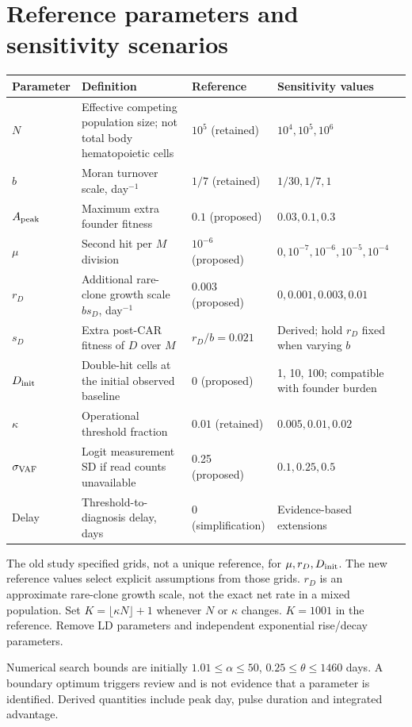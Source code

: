 \documentclass[11pt]{article}
\begin{document}
\section{Reference parameters and sensitivity scenarios}
\begin{longtable}{@{}p{}p{}p{}p{}@{}}
\toprule
Parameter & Definition & Reference & Sensitivity values\\\midrule\endhead
$N$ & Effective competing population size; not total body hematopoietic cells & $10^5$ (retained) & $10^4,10^5,10^6$\\
$b$ & Moran turnover scale, day$^{-1}$ & $1/7$ (retained) & $1/30,1/7,1$\\
$A_{\rm peak}$ & Maximum extra founder fitness & $0.1$ (proposed) & $0.03,0.1,0.3$\\
$\mu$ & Second hit per $M$ division & $10^{-6}$ (proposed) & $0,10^{-7},10^{-6},10^{-5},10^{-4}$\\
$r_D$ & Additional rare-clone growth scale $bs_D$, day$^{-1}$ & $0.003$ (proposed) & $0,0.001,0.003,0.01$\\
$s_D$ & Extra post-CAR fitness of $D$ over $M$ & $r_D/b=0.021$ & Derived; hold $r_D$ fixed when varying $b$\\
$D_{\rm init}$ & Double-hit cells at the initial observed baseline & 0 (proposed) & 1, 10, 100; compatible with founder burden\\
$\kappa$ & Operational threshold fraction & $0.01$ (retained) & $0.005,0.01,0.02$\\
$\sigma_{\rm VAF}$ & Logit measurement SD if read counts unavailable & 0.25 (proposed) & $0.1,0.25,0.5$\\
Delay & Threshold-to-diagnosis delay, days & 0 (simplification) & Evidence-based extensions\\
\bottomrule
\end{longtable}
The old study specified grids, not a unique reference, for $\mu,r_D,D_{\rm init}$. The new reference values select explicit assumptions from those grids. $r_D$ is an approximate rare-clone growth scale, not the exact net rate in a mixed population. Set $K=\lfloor\kappa N\rfloor+1$ whenever $N$ or $\kappa$ changes. $K=1001$ in the reference. Remove LD parameters and independent exponential rise/decay parameters.

Numerical search bounds are initially $1.01\le\alpha\le50$, $0.25\le\theta\le1460$ days. A boundary optimum triggers review and is not evidence that a parameter is identified. Derived quantities include peak day, pulse duration and integrated advantage.
\end{document}
